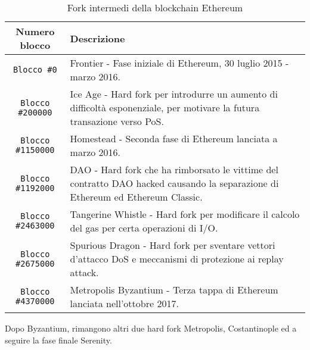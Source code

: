 \begin{table}[]
	\centering
	\begin{tabular}{|c|p{10cm}|}
		\hline
		\textbf{Numero blocco} & \textbf{Descrizione} \\ \hline
		\lstinline|Blocco #0| & Frontier - Fase iniziale di Ethereum, 30 luglio 2015 - marzo 2016.\\ \hline
		\lstinline|Blocco #200000| & Ice Age - Hard fork per introdurre un aumento di difficoltà esponenziale, per motivare la futura transazione verso PoS.\\ \hline
		\lstinline|Blocco #1150000| & Homestead - Seconda fase di Ethereum lanciata a marzo 2016.\\ \hline
		\lstinline|Blocco #1192000| & DAO - Hard fork che ha rimborsato le vittime del contratto DAO hacked causando la separazione di Ethereum ed Ethereum Classic.\\ \hline
		\lstinline|Blocco #2463000| & Tangerine Whistle - Hard fork per modificare il calcolo del gas per certa operazioni di I/O.\\ \hline
		\lstinline|Blocco #2675000| & Spurious Dragon - Hard fork per sventare vettori d'attacco DoS e meccanismi di protezione ai replay attack.\\ \hline
		\lstinline|Blocco #4370000| & Metropolis Byzantium - Terza tappa di Ethereum lanciata nell'ottobre 2017.\\ \hline
	\end{tabular}
	\caption{Fork intermedi della blockchain Ethereum}
	\label{tab:fork-intermedi}
\end{table}
Dopo Byzantium, rimangono altri due hard fork Metropolis, Costantinople ed a seguire la fase finale Serenity.

